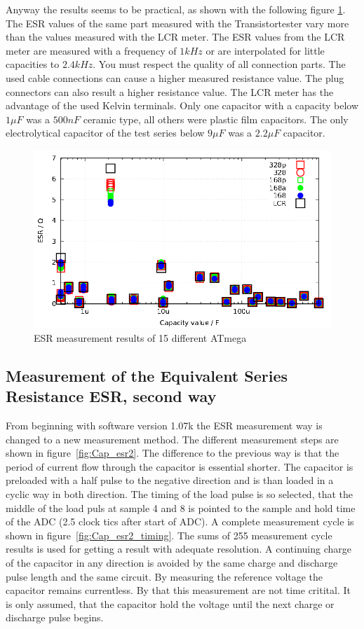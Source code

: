 Anyway the results seems to be practical, as shown with the following figure \ref{fig:Cesr}.
The ESR values of the same part measured with the Transistortester vary more than the values measured with the LCR meter.
The ESR values from the LCR meter are measured with a frequency of \(1kHz\) or are interpolated for little capacities to
\(2.4kHz\).
You must respect the quality of all connection parts. The used cable connections can cause a higher measured resistance value.
The plug connectors can also result a higher resistance value.
The LCR meter has the advantage of the used Kelvin terminals.
Only one capacitor with a capacity below \(1\mu F\) was a \(500nF\) ceramic type, all others were
plastic film capacitors.
The only electrolytical capacitor of the test series below \(9\mu F\) was a \(2.2\mu F\) capacitor.

\begin{figure}[H]
\centering
\includegraphics[width=16cm]{../GNU/Cesr.pdf}
\caption{ESR measurement results of 15 different ATmega}
\label{fig:Cesr}
\end{figure}


\subsection{Measurement of the Equivalent Series Resistance ESR, second way}
\label{sec:ESR2}
From beginning with software version 1.07k the ESR measurement way is changed to a new measurement method.
The different measurement steps are shown in figure~\ref{fig:Cap_esr2}. The difference to the previous way is that
the period of current flow through the capacitor is essential shorter.
The capacitor is preloaded with a half pulse to the negative direction and is than loaded in a cyclic way in both
direction.
The timing of the load pulse is so selected, that the middle of the load puls at sample 4 and 8 is
pointed to the sample and hold time of the ADC (2.5 clock tics after start of ADC). 
A complete measurement cycle is shown in figure~\ref{fig:Cap_esr2_timing}.
The sums of 255 measurement cycle results is used for getting a result with adequate resolution. 
A continuing charge of the capacitor in any direction is avoided by the same charge and discharge pulse length
and the same circuit.
By measuring the reference voltage the capacitor remains currentless. By that this measurement are not time critital.
It is only assumed, that the capacitor hold the voltage until the next charge or discharge pulse begins.

